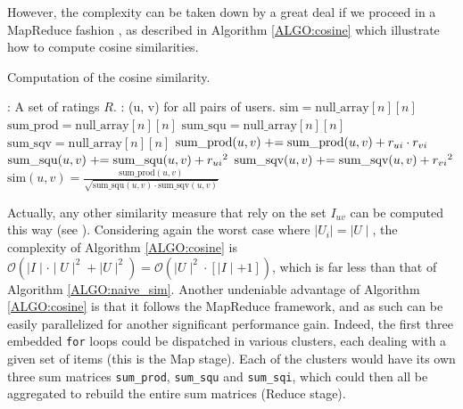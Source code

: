 However, the complexity can be taken down by a great deal if we proceed in a
MapReduce fashion \cite{DeaGhe04}, as described in Algorithm \ref{ALGO:cosine}
which illustrate how to compute cosine similarities.
\begin{algorithm}[!ht]
 \caption{Computation of the cosine similarity.}
       \label{ALGO:cosine}
       \begin{algorithmic}

         : A set of ratings $R$.
         : (u, v) for all pairs of users.
         \STATE $\text{sim} = \text{null\_array}[n][n]$
         \STATE $\text{sum\_prod} = \text{null\_array}[n][n]$
         \STATE $\text{sum\_squ} = \text{null\_array}[n][n]$
         \STATE $\text{sum\_sqv} = \text{null\_array}[n][n]$
              \STATE $\text{sum\_prod}(u, v) \mathrel{+}= \text{sum\_prod}(u, v) +
              r_{ui} \cdot r_{vi}$
              \STATE $\text{sum\_squ}(u, v) \mathrel{+}= \text{sum\_squ}(u, v) +
              {r_{ui}}^2$
              \STATE $\text{sum\_sqv}(u, v) \mathrel{+}= \text{sum\_sqv}(u, v) +
              {r_{vi}}^2$
             \ENDFOR
           \ENDFOR
         \ENDFOR
           \STATE $\text{sim}(u, v) = \frac{\text{sum\_prod}(u,
           v)}{\sqrt{\text{sum\_squ}(u, v) \cdot \text{sum\_sqv}(u, v)}}$
           \ENDFOR
         \ENDFOR
\end{algorithmic}
\end{algorithm}
Actually, any other similarity measure that rely on the set $I_{uv}$ can be
computed this way (see \cite{SchBodVolRECSYS12}). Considering again the worst
case where $\mid U_i \mid = \mid U \mid$, the complexity of Algorithm
\ref{ALGO:cosine} is  $\mathcal{O}(\mid I \mid \cdot \mid U \mid^2 + \mid
U \mid^2) = \mathcal{O}( \mid U \mid^2 \cdot [ \mid I \mid + 1])$, which is far
less than that of Algorithm \ref{ALGO:naive_sim}. Another undeniable advantage
of Algorithm  \ref{ALGO:cosine} is that it follows the MapReduce framework, and
as such can be easily parallelized for another significant performance gain.
Indeed, the first three embedded \texttt{for} loops could be dispatched in various
clusters, each dealing with a given set of items (this is the Map stage). Each
of the clusters would have its own three sum matrices \texttt{sum\_prod},
\texttt{sum\_squ} and \texttt{sum\_sqi}, which could then all be aggregated to
rebuild the entire sum matrices (Reduce stage).

